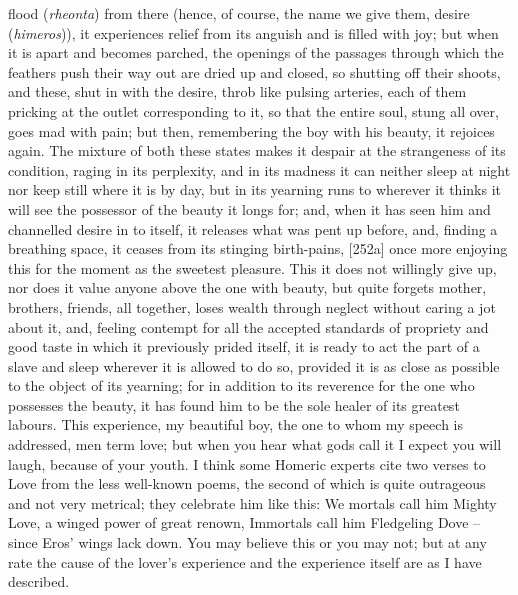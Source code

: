flood ({\em rheonta}) from there (hence, of course, the name we give
them, desire
({\em himeros})), it
 experiences relief from its anguish and is filled with joy; but
when it is apart and becomes parched, the openings of the passages
through which the feathers push their way out are dried up and closed,
so shutting off their shoots, and these, shut  in with the
desire, throb like
pulsing arteries, each of them pricking at the outlet corresponding to
it, so that the entire soul, stung all over, goes mad with pain; but
then, remembering the boy with his
beauty, it rejoices
again. The mixture of both these states makes it despair at the
strangeness of its  condition, raging in its perplexity, and in
its madness it can neither sleep at night nor keep still where it is by
day, but in its yearning runs to wherever it thinks it will see the
possessor of the beauty it longs for; and, when it has seen him and
channelled desire in to
itself, it releases what was pent up before, and,  finding a
breathing space, it ceases from its stinging birth-pains, {[}252a{]}
once more enjoying this for the moment as the sweetest pleasure. This it
does not willingly give up, nor does it value anyone above the one with
beauty, but quite forgets mother, brothers, friends, all together, loses
wealth through neglect without caring a jot about it, and, feeling
contempt for all the accepted  standards of propriety and good
taste in which it previously prided itself, it is ready to act the part
of a slave and sleep wherever it is allowed to do so, provided it is as
close as possible to the object of its yearning; for in addition to its
reverence for the one who possesses the beauty, it has found him to be
the  sole healer of its greatest labours. This experience, my
beautiful boy, the one to whom my speech is addressed, men term love;
but when you hear what gods call it I expect you will laugh, because of
your youth. I think some Homeric experts cite two  verses to
Love from the less well-known poems, the second of which is quite
outrageous and not very metrical; they celebrate him like this: We
mortals call him Mighty Love, a winged power of great renown, Immortals
call him Fledgeling Dove -- since Eros' wings lack
down. You may believe
this or you may not; but at any rate the cause  of the lover's
experience and the experience itself are as I have described.


